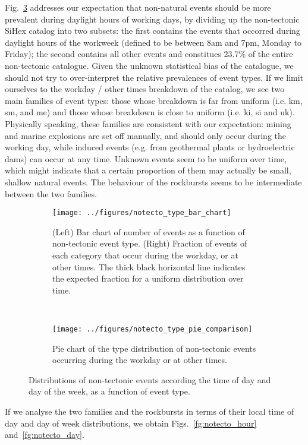 Fig.~\ref{fg:notecto_day_night} addresses our expectation that non-natural
events should be more prevalent during daylight hours of working days, by
dividing up the non-tectonic SiHex catalog into two subsets: the first contains
the events that occorred during daylight hours of the workweek (defined to be
between 8am and 7pm, Monday to Friday); the second contains all other
events and constitues 23.7\% of the entire non-tectonic catalogue. Given the
unknown statistical bias of the catalogue, we should not try to over-interpret
the relative prevalences of event types. If we limit ourselves to the workday /
other times breakdown of the catalog, we see two main families of event types:
those whose breakdown is far from uniform (i.e.  km, sm, and me) and those
whose breakdown is close to uniform (i.e. ki, si and
uk). Physically speaking, these families are consistent with our expectation:
mining and marine explosions are set off manually, and should only occur during
the working day, while induced events (e.g. from geothermal plants or
hydroelectric dams) can occur at any time. Unknown events seem to be
uniform over time, which might indicate that a certain proportion of them may
actually be small, shallow natural events. The behaviour of the rockbursts
seems to be intermediate between the two families.

\begin{figure}
\centering
\begin{subfigure}[t]{\textwidth}
	\centering
	\texttt{[image: ../figures/notecto\_type\_bar\_chart]}
	\caption{(Left) Bar chart of number of events as a function of non-tectonic
	event type. (Right) Fraction of events of each category that occur
	during the workday, or at other times. The thick black horizontal line
	indicates the expected fraction for a uniform distribution over time.} 
	\label{fg:notecto_bar}
\end{subfigure}
~
\begin{subfigure}[t]{\textwidth}
	\centering
	\texttt{[image: ../figures/notecto\_type\_pie\_comparison]}
	\caption{Pie chart of the type distribution of non-tectonic events
	occurring during the workday or at other times.} 
	\label{fg:notecto_pie}
\end{subfigure}
\caption{Distributions of non-tectonic events according the time of day and day
of the week, as a function of event type.}
\label{fg:notecto_day_night}
\end{figure}

If we analyse the two families and the rockbursts in terms of their local time
of day and day of week distributions, we obtain Figs.~\ref{fg:notecto_hour}
and~\ref{fg:notecto_day}.
